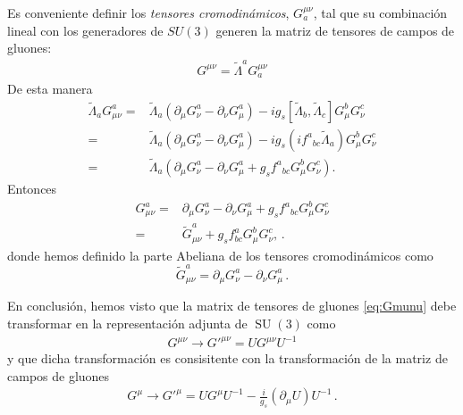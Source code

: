 \begin{frame}
Es conveniente definir los \emph{tensores cromodinámicos}, $G^{\mu\nu}_a$, tal que su combinación lineal con los generadores de $SU(3)$ generen la matriz de tensores de campos de gluones:
\begin{align}
\label{eq:Gmunu}
G^{\mu\nu}=\widetilde{\Lambda}^aG^{\mu\nu}_a
\end{align}
De esta manera
\begin{align}
  \widetilde{\Lambda}_a G_{\mu\nu}^a=& \widetilde{\Lambda}_a
\left( \partial_{\mu}G_{\nu}^{a}-\partial_{\nu}G_{\mu}^{a}  \right)
-i g_s \left[ \widetilde{\Lambda}_b,\widetilde{\Lambda}_c \right]G_{\mu}^{b}G_{\nu}^{c} \nonumber\\
=&\widetilde{\Lambda}_a
\left( \partial_{\mu}G_{\nu}^{a}-\partial_{\nu}G_{\mu}^{a}  \right)
-i g_s \left(i {f^{a}}_{bc} \widetilde{\Lambda}_a \right)G_{\mu}^{b}G_{\nu}^{c} \nonumber\\
=&\widetilde{\Lambda}_a \left(  \partial_{\mu}G_{\nu}^{a}-\partial_{\nu}G_{\mu}^{a} 
+g_s  {f^{a}}_{bc} G_{\mu}^{b}G_{\nu}^{c}\right).
\end{align}
Entonces
\begin{align}
  \label{eq:258qft}
  G_{\mu\nu}^a=&\partial_{\mu}G_{\nu}^{a}-\partial_{\nu}G_{\mu}^{a}+
g_s{f^{a}}_{bc}G_{\mu}^{b}G_{\nu}^{c} \nonumber\\
=&\widetilde{G}_{\mu\nu}^a+g_s f^a_{bc}G_\mu^b G_\nu^c,\,.
\end{align}
donde hemos definido la parte Abeliana de los tensores cromodinámicos como
\begin{equation}
  \widetilde{G}_{\mu\nu}^a=\partial_\mu G_\nu^a-\partial_\nu G_\mu^a\,.
\end{equation}



En conclusión, hemos visto que la matrix de tensores de gluones \eqref{eq:Gmunu} debe transformar en la representación adjunta de $\operatorname{SU}(3)$ como
\begin{align}
\label{eq:pGmunu}
  G^{\mu\nu}\to  {G'}^{\mu\nu}=U  G^{\mu\nu} U^{-1}
\end{align}
y que dicha transformación es consisitente con la transformación de la matriz de campos de gluones
\begin{align}
  G^{\mu}\to {G'}^{\mu}= U G^{\mu} U^{-1}
-\frac{i}{g_s} \left( \partial_{\mu} U \right) U^{-1}\,.
\end{align}



\end{frame}
